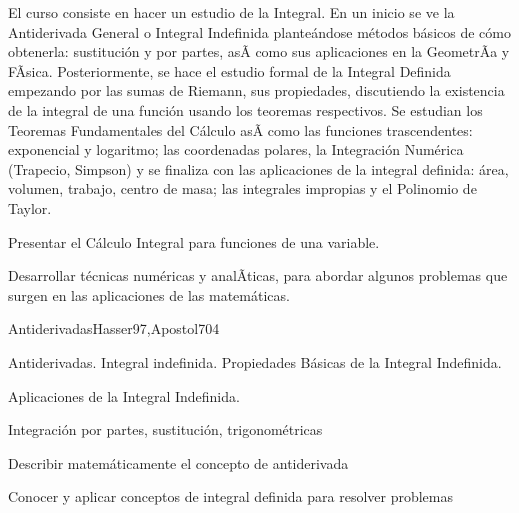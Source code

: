 \begin{syllabus}


\begin{justification}
El curso consiste en hacer un estudio de la Integral. En un inicio se ve la Antiderivada General o Integral Indefinida planteándose métodos básicos de cómo obtenerla: sustitución y por partes, asÃ­ como sus aplicaciones en la GeometrÃ­a y FÃ­sica. Posteriormente, se hace el estudio formal de la Integral Definida empezando por las sumas de Riemann, sus propiedades, discutiendo la existencia de la integral de una función usando los teoremas respectivos. Se estudian los Teoremas Fundamentales del Cálculo asÃ­ como las funciones trascendentes: exponencial y logaritmo; las coordenadas polares, la Integración Numérica (Trapecio, Simpson) y se finaliza con las aplicaciones de la integral definida: área, volumen, trabajo, centro de masa; las integrales impropias y el Polinomio de Taylor.
\end{justification}

\begin{goals}
\item Presentar el Cálculo Integral para funciones de una variable.
\item Desarrollar técnicas numéricas y analÃ­ticas, para abordar algunos problemas que surgen en las aplicaciones de las matemáticas.
\end{goals}

\begin{outcomes}
\end{outcomes}

\begin{unit}{Antiderivadas}{Hasser97,Apostol70}{4}
\begin{topics}
      \item Antiderivadas. Integral indefinida. Propiedades Básicas de la  Integral Indefinida.
      \item Aplicaciones de la Integral Indefinida.
      \item Integración por partes,  sustitución, trigonométricas
   \end{topics}

   \begin{unitgoals}
      \item Describir matemáticamente el concepto de antiderivada
      \item Conocer y aplicar conceptos de integral definida para resolver problemas
   \end{unitgoals}
\end{unit}


\end{syllabus}
